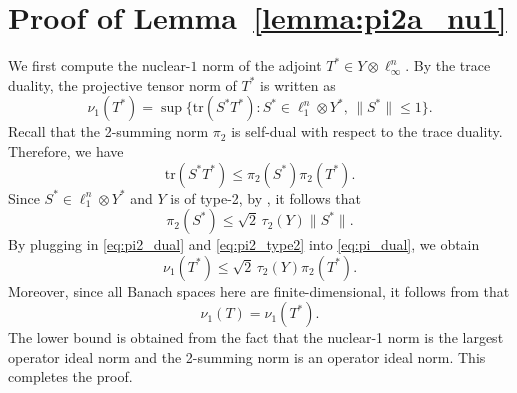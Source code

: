 \documentclass[11pt]{article}
\begin{document}
\section{Proof of Lemma~\ref{lemma:pi2a_nu1}}
\label{sec:proof:lemma:pi2a_nu1}
We first compute the nuclear-$1$ norm of the adjoint $T^* \in Y \otimes \ell_\infty^n$. 
By the trace duality, the projective tensor norm of $T^*$ is written as
\begin{equation}
\label{eq:pi_dual}
\nu_1(T^*) = \sup \{ \mathrm{tr}(S^*T^*) : S^* \in \ell_1^n \otimes Y^*, \, \|S^*\| \leq 1 \}.
\end{equation}
Recall that the 2-summing norm $\pi_2$ is self-dual with respect to the trace duality. Therefore, we have
\begin{equation}
\label{eq:pi2_dual}
\mathrm{tr}(S^*T^*) \leq \pi_2(S^*) \pi_2(T^*).
\end{equation}
Since $S^* \in \ell_1^n \otimes Y^*$ and $Y$ is of type-2, by \cite[Propositions~9.3 and 9.8]{jameson1987summing}, it follows that
\begin{equation}
\label{eq:pi2_type2}
\pi_2(S^*) \leq \sqrt{2} \, \tau_2(Y) \|S^*\|.
\end{equation}
By plugging in \eqref{eq:pi2_dual} and \eqref{eq:pi2_type2} into \eqref{eq:pi_dual}, we obtain
\[
\nu_1(T^*) \leq \sqrt{2} \, \tau_2(Y) \pi_2(T^*).
\]
Moreover, since all Banach spaces here are finite-dimensional, it follows from \cite[Proposition~1.13]{jameson1987summing} that
\[
\nu_1(T) = \nu_1(T^*).
\]
The lower bound is obtained from the fact that the nuclear-1 norm is the largest operator ideal norm and the 2-summing norm is an operator ideal norm. 
This completes the proof.
\end{document}
